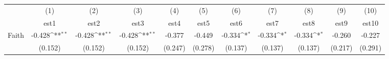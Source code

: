 {
\def\sym#1{\ifmmode^{#1}\else\(^{#1}\)\fi}
\begin{tabular}{l*{10}{c}}
\toprule
            &\multicolumn{1}{c}{(1)}&\multicolumn{1}{c}{(2)}&\multicolumn{1}{c}{(3)}&\multicolumn{1}{c}{(4)}&\multicolumn{1}{c}{(5)}&\multicolumn{1}{c}{(6)}&\multicolumn{1}{c}{(7)}&\multicolumn{1}{c}{(8)}&\multicolumn{1}{c}{(9)}&\multicolumn{1}{c}{(10)}\\
            &\multicolumn{1}{c}{est1}&\multicolumn{1}{c}{est2}&\multicolumn{1}{c}{est3}&\multicolumn{1}{c}{est4}&\multicolumn{1}{c}{est5}&\multicolumn{1}{c}{est6}&\multicolumn{1}{c}{est7}&\multicolumn{1}{c}{est8}&\multicolumn{1}{c}{est9}&\multicolumn{1}{c}{est10}\\
\midrule
Faith       &      -0.428\sym{**} &      -0.428\sym{**} &      -0.428\sym{**} &      -0.377         &      -0.449         &      -0.334\sym{*}  &      -0.334\sym{*}  &      -0.334\sym{*}  &      -0.260         &      -0.227         \\
            &     (0.152)         &     (0.152)         &     (0.152)         &     (0.247)         &     (0.278)         &     (0.137)         &     (0.137)         &     (0.137)         &     (0.217)         &     (0.291)         \\
\bottomrule
\end{tabular}
}
